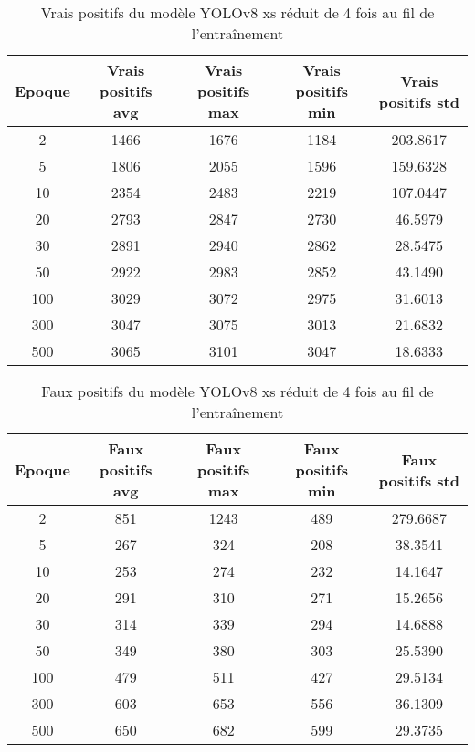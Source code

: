 \begin{table}[!ht]
    \caption{Vrais positifs du modèle YOLOv8 xs réduit de 4 fois au fil de l'entraînement}
    \label{tab:yolov8xs_reduced4x_true_positive}
    \centering
    \begin{tabular}{ |c||c|c|c|c|  }
        \hline
        \rowcolor{gray!50}
        Epoque & Vrais positifs avg & Vrais positifs max & Vrais positifs min & Vrais positifs std\\
        \hline
        2 & 1466 & 1676 & 1184 & 203.8617\\
        5 & 1806 & 2055 & 1596 & 159.6328\\
        10 & 2354 & 2483 & 2219 & 107.0447\\
        20 & 2793 & 2847 & 2730 & 46.5979\\
        30 & 2891 & 2940 & 2862 & 28.5475\\
        50 & 2922 & 2983 & 2852 & 43.1490\\
        100 & 3029 & 3072 & 2975 & 31.6013\\
        300 & 3047 & 3075 & 3013 & 21.6832\\
        500 & 3065 & 3101 & 3047 & 18.6333\\
        \hline
    \end{tabular}
\end{table}

\begin{table}[!ht]
    \caption{Faux positifs du modèle YOLOv8 xs réduit de 4 fois au fil de l'entraînement}
    \label{tab:yolov8xs_reduced4x_false_positive}
    \centering
    \begin{tabular}{ |c||c|c|c|c|  }
        \hline
        \rowcolor{gray!50}
        Epoque & Faux positifs avg & Faux positifs max & Faux positifs min & Faux positifs std\\
        \hline
        2 & 851 & 1243 & 489 & 279.6687\\
        5 & 267 & 324 & 208 & 38.3541\\
        10 & 253 & 274 & 232 & 14.1647\\
        20 & 291 & 310 & 271 & 15.2656\\
        30 & 314 & 339 & 294 & 14.6888\\
        50 & 349 & 380 & 303 & 25.5390\\
        100 & 479 & 511 & 427 & 29.5134\\
        300 & 603 & 653 & 556 & 36.1309\\
        500 & 650 & 682 & 599 & 29.3735\\
        \hline
    \end{tabular}
\end{table}

